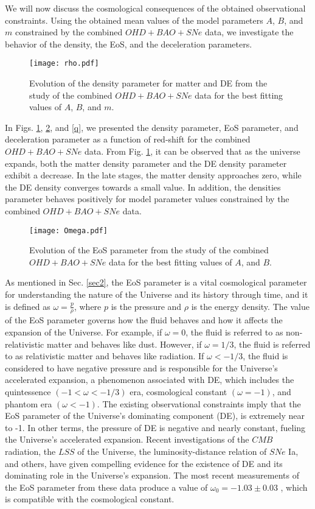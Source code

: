 \documentclass[prd,superscriptaddress,amsfonts,amssymb,amsmath,showpacs,twocolumn]{revtex4-2}
\begin{document}
We will now discuss the cosmological consequences of the obtained
observational constraints. Using the obtained mean values of the model
parameters $A$, $B$, and $m$ constrained by the combined $OHD+BAO+SNe$ data,
we investigate the behavior of the density, the EoS, and the deceleration parameters.

\begin{figure}[h]
\centerline{\texttt{[image: rho.pdf]}}
\caption{Evolution of the density parameter for matter and DE from the study of the combined $OHD+BAO+SNe$ data for the best fitting values of $A$, $B$, and $m$.}
\label{rho}
\end{figure}

In Figs. \ref{rho}, \ref{Omega}, and \ref{q}, we presented the density
parameter, EoS parameter, and deceleration parameter as a function
of red-shift for the combined $OHD+BAO+SNe$ data. From Fig. \ref{rho}, it can be observed that as the universe expands, both the matter density parameter and the DE density parameter exhibit a decrease. In the late stages, the matter density approaches zero, while the DE density converges towards a small value. In addition, the densities parameter behaves positively for model parameter values constrained by the combined $OHD+BAO+SNe$ data.

\begin{figure}[h]
\centerline{\texttt{[image: Omega.pdf]}}
\caption{Evolution of the EoS parameter from the study of the
combined $OHD+BAO+SNe$ data for the best fitting values of $A$, and $B$.}
\label{Omega}
\end{figure}

As mentioned in Sec. \ref{sec2}, the EoS parameter is a vital cosmological
parameter for understanding the nature of the Universe and its history
through time, and it is defined as $\omega =\frac{p}{\rho }$, where $p$ is
the pressure and $\rho$ is the energy density. The value of the EoS
parameter governs how the fluid behaves and how it affects the expansion of
the Universe. For example, if $\omega = 0$, the fluid is referred to as
non-relativistic matter and behaves like dust. However, if $\omega = 1/3$,
the fluid is referred to as relativistic matter and behaves like radiation.
If $\omega <-1/3$, the fluid is considered to have negative pressure and is
responsible for the Universe's accelerated expansion, a phenomenon
associated with DE, which includes the quintessence $(-1< \omega < -1/3)$
era, cosmological constant $(\omega=-1)$, and phantom era $(\omega <-1)$.
The existing observational constraints imply that the EoS parameter of the
Universe's dominating component (DE), is extremely near to -1. In other
terms, the pressure of DE is negative and nearly constant, fueling the
Universe's accelerated expansion. Recent investigations of the $CMB$
radiation, the $LSS$ of the Universe, the luminosity-distance relation of $SNe$
Ia, and others, have given compelling evidence for the existence of DE and
its dominating role in the Universe's expansion. The most recent
measurements of the EoS parameter from these data produce a value of $%
\omega_{0}= -1.03 \pm 0.03$ \cite{Planck2020}, which is compatible with the
cosmological constant.
\end{document}
